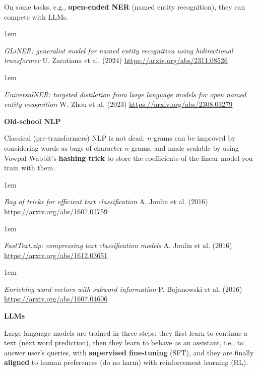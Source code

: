 \documentclass[a5paper]{article}
\let\d\textbf
\newenvironment{reference}{%
  \medskip\goodbreak
  \parskip 0pt
  \raggedright
  \leftskip 1em
  \obeylines
}{\par\medskip\goodbreak}
\def\section#1{\clearpage{\vspace*{0cm}\LARGE\centering\bfseries #1\par\bigskip\bigskip}}
\def\subsection#1{{\par\bigskip\goodbreak\large\bfseries #1\par}}
\begin{document}
On some tasks, e.g., \d{open-ended NER} (named entity recognition), they can compete with LLMs.

\begin{reference}
  \emph{GLiNER: generalist model for named entity recognition using bidirectional transformer}
  U. Zaratiana et al. (2024)
  \url{https://arxiv.org/abs/2311.08526}
\end{reference}

\begin{reference}
  \emph{UniversalNER: targeted distilation  from large language models  for open named entity recognition}
  W. Zhou et al. (2023)
  \url{https://arxiv.org/abs/2308.03279}
\end{reference}

\subsection{Old-school NLP}

Classical (pre-transformers) NLP is not dead: $n$-grams can be improved
by considering words as bags of character $n$-grams,
and made scalable by using
Vowpal Wabbit's \d{hashing trick} to store the coefficients of the linear model you train with them.

\begin{reference}
  \emph{Bag of tricks for efficient text classification}
  A. Joulin et al. (2016)
  \url{https://arxiv.org/abs/1607.01759}
\end{reference}

\begin{reference}
  \emph{FastText.zip:  compressing text classification models}
  A. Joulin et al. (2016)
  \url{https://arxiv.org/abs/1612.03651}
\end{reference}

\begin{reference}
  \emph{Enriching word vectors  with subword information}
  P. Bojanowski et al. (2016)
  \url{https://arxiv.org/abs/1607.04606}
\end{reference}

\section{Training}

\subsection{LLMs}

Large language models are trained in three steps:
they first learn to continue a text (next word prediction),
then they learn to behave as an assistant, i.e., to answer user's queries, with \d{supervised fine-tuning} (SFT),
and they are finally \d{aligned} to human preferences (do no harm) with reinforcement learning (RL).
\end{document}
